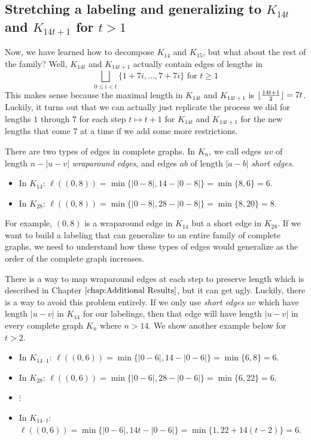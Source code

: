 \subsection{Stretching a labeling and generalizing to $K_{14t}$ and $K_{14t+1}$ for $t>1$}\label{sec:0,1constr-pt2}

  Now, we have learned how to decompose $K_{14}$ and $K_{15}$, but what about the rest of the family? Well, $K_{14t}$ and $K_{14t+1}$ actually contain edges of lengths in 
  $$\bigsqcup_{0\leq i< t} \{1+7i,\hdots,7+7i\}\text{ for }t\geq 1$$
  This makes sense because the maximal length in $K_{14t}$ and $K_{14t+1}$ is $\lfloor\frac{14t+1}{2}\rfloor=7t$. Luckily, it turns out that we can actually just replicate the process we did for lengths $1$ through $7$ for each step $t\mapsto t+1$ for $K_{14t}$ and $K_{14t+1}$ for the new lengths that come $7$ at a time if we add some more restrictions.

  There are two types of edges in complete graphs. In $K_{n}$, we call edges $uv$ of length $n-|u-v|$ \textit{wraparound edges}, and edges $ab$ of length $|a-b|$ \textit{short edges}. 
  \begin{itemize}
    \item[] In $K_{14}$: $\ell((0,8))=\min\{|0-8|,14-|0-8|\}=\min\{8,6\}=6$.
    \item[] In $K_{28}$: $\ell((0,8))=\min\{|0-8|,28-|0-8|\}=\min\{8,20\}=8$.
  \end{itemize} 
  For example, $(0,8)$ is a wraparound edge in $K_{14}$ but a short edge in $K_{28}$. If we want to build a labeling that can generalize to an entire family of complete graphs, we need to understand how these types of edges would generalize as the order of the complete graph increases.

  There is a way to map wraparound edges at each step to preserve length which is described in Chapter $\ref{chap:Additional Results}$, but it can get ugly. Luckily, there is a way to avoid this problem entirely. If we only use \textit{short edges} $uv$ which have length $|u-v|$ in $K_{14}$ for our labelings, then that edge will have length $|u-v|$ in every complete graph $K_{n}$ where $n>14$. We show another example below for $t>2$. 
  \begin{itemize}
    \item[] In $K_{14\cdot 1}$: $\ell((0,6))=\min\{|0-6|,14-|0-6|\}=\min\{6,8\}=6$.
    \item[] In $K_{28}$: $\ell((0,6))=\min\{|0-6|,28-|0-6|\}=\min\{6,22\}=6$.
    \item[] $\vdots$
    \item[] In $K_{14\cdot t}$: $\ell((0,6))=\min\{|0-6|,14t-|0-6|\}=\min\{1,22+14(t-2)\}=6$.
  \end{itemize}

